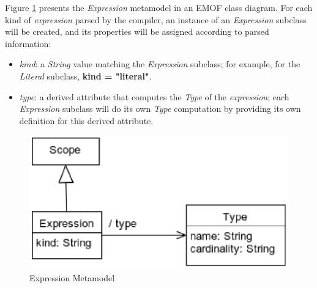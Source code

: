 \begin{abstract-syntax}
Figure \ref{fig:meta:expression} presents the \emph{Expression} metamodel
in an EMOF \cite{mof} class diagram.
For each kind of \emph{expression} parsed by the compiler,
an instance of an \emph{Expression} subclass will be created,
and its properties will be assigned
according to parsed information:

\begin{itemize}

\item \emph{kind}:
a \emph{String} value matching the \emph{Expression} subclass;
for example, for the \emph{Literal} subclass, \textbf{kind = "literal"}.

\item \emph{type}:
a derived attribute that computes the \emph{Type} of the \emph{expression};
each \emph{Expression} subclass will do its own \emph{Type} computation
by providing its own definition for this derived attribute.

\end{itemize}
\end{abstract-syntax}

\begin{figure}
\includegraphics[width=\textwidth]{metamodel/expression}
\caption{Expression Metamodel}
\label{fig:meta:expression}
\end{figure}
